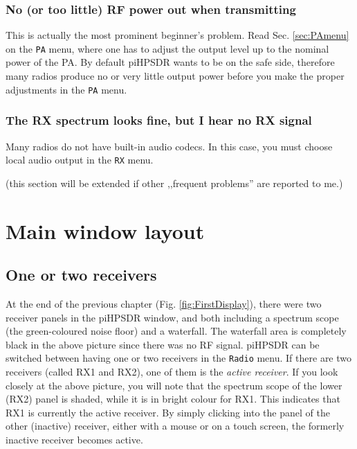 \documentclass[12pt]{book}
\def\bltt#1{\texttt{\color{blue}#1}}
\def\pH{pi\-HPSDR\xspace}
\begin{document}
\subsection{No (or too little) RF power out when transmitting}

This is actually the most prominent beginner's problem. Read Sec. \ref{sec:PAmenu} on the \bltt{PA} menu,
where one has to adjust the output level up to the nominal power of the PA. By default \pH wants to
be on the safe side, therefore many radios produce no or very little output power before you make
the proper adjustments in the \bltt{PA} menu.


\subsection{The RX spectrum looks fine, but I hear no RX signal}

Many radios do not have built-in audio codecs. In this case, you must choose local audio output in
the \bltt{RX} menu.


(this section will be extended if other ,,frequent problems'' are reported to me.)
\chapter{Main window layout}

\section{One or two receivers}
At the end of the previous chapter (Fig. \ref{fig:FirstDisplay}),
there were two receiver panels in the
\pH window, and both including a spectrum scope
(the green-coloured noise floor) and a waterfall. The waterfall area
is completely black in the above picture since there was no RF signal.
\pH can be switched between having one or two receivers in the
\bltt{Radio} menu. If there are two receivers (called RX1 and RX2),
one of them is the \textit{active receiver}. If you look closely
at the above picture, you will note that the spectrum scope of
the lower (RX2) panel is shaded, while it is in bright colour for RX1.
This indicates that RX1 is currently the active receiver. By simply
clicking into the panel of the other (inactive) receiver, either with
a mouse or on a touch screen, the formerly inactive receiver becomes
active.
\end{document}
